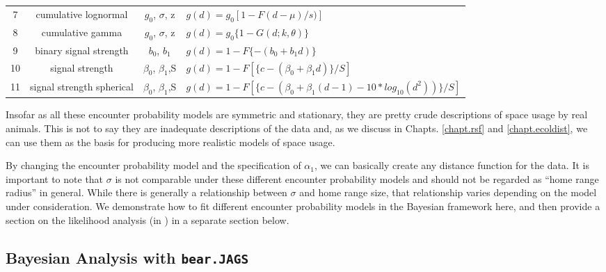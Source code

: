 \begin{table}[ht]
\begin{tabular}{cccl}
7 &cumulative lognormal     & $g_0$, $\sigma$, z & $g(d) = g_0 [1 -F{(d-\mu)/s)}]$  \\
8 &cumulative gamma         & $g_0$, $\sigma$, z  & $g(d) = g_0 \{ 1 - G (d; k,  \theta) \}$  \\
9 &binary signal strength   & $b_0$, $b_1$       & $g(d) = 1 - F \{- (b_0 + b_1 d) \}$ \\
10&signal strength          & $\beta_0$, $\beta_1$,S  &
  $g(d) = 1 - F[ \{c - (\beta_0 + \beta_1 d)\} / S]$  \\
11&signal strength spherical&  $\beta_0$, $\beta_1$,S & 
\parbox[t]{2in}{ $g(d) = 1 - F[\{c - (\beta_0 + \beta_1(d-1)- 10 * log_{10} ( d^2 ) ) \} / S]$ 
} \\ \hline
\end{tabular}
\label{covariates.tab.detmodels}
\end{table}


Insofar as all these encounter probability models
are symmetric and stationary, they are pretty
crude descriptions of space usage by real animals. This is not to
say they are inadequate descriptions of the data and, as we discuss in
Chapts. \ref{chapt.rsf} and \ref{chapt.ecoldist}, we can use them as the
basis for producing more realistic models of space usage.  

By changing the encounter probability model
and the specification of
$\alpha_1$, we can basically create any distance function for the
data. It is important to note that $\sigma$ is not comparable under
these different encounter probability models
and should not be
regarded as ``home range radius'' in general.  While there is
generally a relationship between $\sigma$ and home range size, that
relationship varies depending on the model under consideration. We
demonstrate how to fit different encounter probability models
 in the Bayesian
framework here, and then provide a section on the likelihood analysis
(in \secr) in a separate section below.

\subsection{Bayesian Analysis with {\tt bear.JAGS}}

